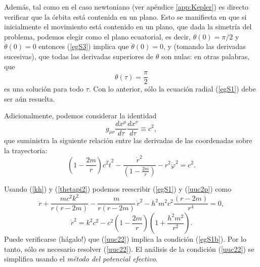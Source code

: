 Además, tal como en el caso newtoniano (ver apéndice \ref{app:Kepler}) es directo verificar que la órbita está contenida en un plano. Esto se manifiesta en que si inicialmente el movimiento está contenido en un plano, que dada la simetría del problema, podemos elegir como el plano ecuatorial, es decir, $\theta(0)=\pi/2$ y $\dot\theta(0)=0$ entonces
(\ref{egS3}) implica que $\ddot\theta(0)=0$, y (tomando las derivadas sucesivas), que todas las derivadas superiores de $\theta$ son nulas: en otras palabras, que
\begin{equation}
\theta(\tau)=\frac{\pi}{2} \label{thetapi2}
\end{equation}
es una solución para todo $\tau$. Con lo anterior, sólo la ecuación radial
(\ref{egS1}) debe ser aún resuelta.

Adicionalmente, podemos considerar la identidad
\begin{equation}
g_{\mu\nu}\frac{dx^\mu}{d\tau}\frac{dx^\nu}{d\tau}\equiv c^2,
\end{equation}
que suministra la siguiente relación entre las derivadas de las coordenadas sobre la
trayectoria:
\begin{equation}
 \left(1-\frac{2m}{r}\right)c^2\dot{t}^2
-\frac{\dot{r}^2}{\left(1-\frac{2m}{r}\right)}-r^2\dot{\varphi}^2=c^2.
\label{uuc2p}
\end{equation}


Usando (\ref{kh}) y (\ref{thetapi2}) podemos reescribir (\ref{egS1}) y
(\ref{uuc2p}) como
\begin{equation}
\ddot{r}+\frac{mc^2k^2}{r(r-2m)}-\frac{m}{r(r-2m)}\,
\dot{r}^2-h^2m^2c^2\frac{(r-2m)}{r^4} =0,
\label{egS1b}
\end{equation}
\begin{equation}
 \dot{r}^2=k^2c^2-c^2\left(1-\frac{2m}{r}\right)\left(1+\frac{h^2m^2}{r^2}
\right). \label{uuc22}
\end{equation}
Puede verificarse (hágalo!) que (\ref{uuc22}) implica la condición (\ref{egS1b}). Por lo tanto, sólo es necesario resolver (\ref{uuc22}). El análisis de la condición (\ref{uuc22}) se simplifica usando el \textit{método del potencial efectivo}.

